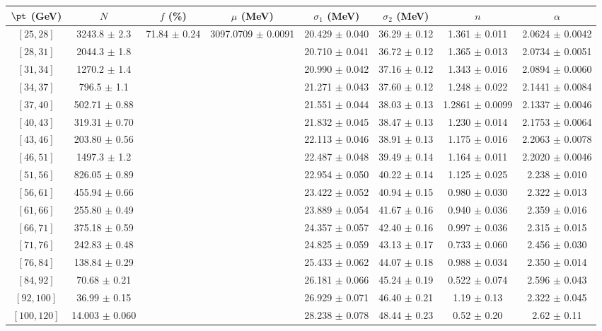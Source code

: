 \begin{tabular}{c||c|c|c|c|c|c|c}
$\pt$ (GeV) & $N$ & $f$ (\%) & $\mu$ (MeV) & $\sigma_1$ (MeV) & $\sigma_2$ (MeV) & $n$ & $\alpha$ \\
\hline
$[25, 28]$ & 3243.8 $\pm$ 2.3 & \multirow{17}{*}{71.84 $\pm$ 0.24} & \multirow{17}{*}{3097.0709 $\pm$ 0.0091} & 20.429 $\pm$ 0.040 & 36.29 $\pm$ 0.12 & 1.361 $\pm$ 0.011 & 2.0624 $\pm$ 0.0042\\
$[28, 31]$ & 2044.3 $\pm$ 1.8 &  &  & 20.710 $\pm$ 0.041 & 36.72 $\pm$ 0.12 & 1.365 $\pm$ 0.013 & 2.0734 $\pm$ 0.0051\\
$[31, 34]$ & 1270.2 $\pm$ 1.4 &  &  & 20.990 $\pm$ 0.042 & 37.16 $\pm$ 0.12 & 1.343 $\pm$ 0.016 & 2.0894 $\pm$ 0.0060\\
$[34, 37]$ & 796.5 $\pm$ 1.1 &  &  & 21.271 $\pm$ 0.043 & 37.60 $\pm$ 0.12 & 1.248 $\pm$ 0.022 & 2.1441 $\pm$ 0.0084\\
$[37, 40]$ & 502.71 $\pm$ 0.88 &  &  & 21.551 $\pm$ 0.044 & 38.03 $\pm$ 0.13 & 1.2861 $\pm$ 0.0099 & 2.1337 $\pm$ 0.0046\\
$[40, 43]$ & 319.31 $\pm$ 0.70 &  &  & 21.832 $\pm$ 0.045 & 38.47 $\pm$ 0.13 & 1.230 $\pm$ 0.014 & 2.1753 $\pm$ 0.0064\\
$[43, 46]$ & 203.80 $\pm$ 0.56 &  &  & 22.113 $\pm$ 0.046 & 38.91 $\pm$ 0.13 & 1.175 $\pm$ 0.016 & 2.2063 $\pm$ 0.0078\\
$[46, 51]$ & 1497.3 $\pm$ 1.2 &  &  & 22.487 $\pm$ 0.048 & 39.49 $\pm$ 0.14 & 1.164 $\pm$ 0.011 & 2.2020 $\pm$ 0.0046\\
$[51, 56]$ & 826.05 $\pm$ 0.89 &  &  & 22.954 $\pm$ 0.050 & 40.22 $\pm$ 0.14 & 1.125 $\pm$ 0.025 & 2.238 $\pm$ 0.010\\
$[56, 61]$ & 455.94 $\pm$ 0.66 &  &  & 23.422 $\pm$ 0.052 & 40.94 $\pm$ 0.15 & 0.980 $\pm$ 0.030 & 2.322 $\pm$ 0.013\\
$[61, 66]$ & 255.80 $\pm$ 0.49 &  &  & 23.889 $\pm$ 0.054 & 41.67 $\pm$ 0.16 & 0.940 $\pm$ 0.036 & 2.359 $\pm$ 0.016\\
$[66, 71]$ & 375.18 $\pm$ 0.59 &  &  & 24.357 $\pm$ 0.057 & 42.40 $\pm$ 0.16 & 0.997 $\pm$ 0.036 & 2.315 $\pm$ 0.015\\
$[71, 76]$ & 242.83 $\pm$ 0.48 &  &  & 24.825 $\pm$ 0.059 & 43.13 $\pm$ 0.17 & 0.733 $\pm$ 0.060 & 2.456 $\pm$ 0.030\\
$[76, 84]$ & 138.84 $\pm$ 0.29 &  &  & 25.433 $\pm$ 0.062 & 44.07 $\pm$ 0.18 & 0.988 $\pm$ 0.034 & 2.350 $\pm$ 0.014\\
$[84, 92]$ & 70.68 $\pm$ 0.21 &  &  & 26.181 $\pm$ 0.066 & 45.24 $\pm$ 0.19 & 0.522 $\pm$ 0.074 & 2.596 $\pm$ 0.043\\
$[92, 100]$ & 36.99 $\pm$ 0.15 &  &  & 26.929 $\pm$ 0.071 & 46.40 $\pm$ 0.21 & 1.19 $\pm$ 0.13 & 2.322 $\pm$ 0.045\\
$[100, 120]$ & 14.003 $\pm$ 0.060 &  &  & 28.238 $\pm$ 0.078 & 48.44 $\pm$ 0.23 & 0.52 $\pm$ 0.20 & 2.62 $\pm$ 0.11\\
\end{tabular}
